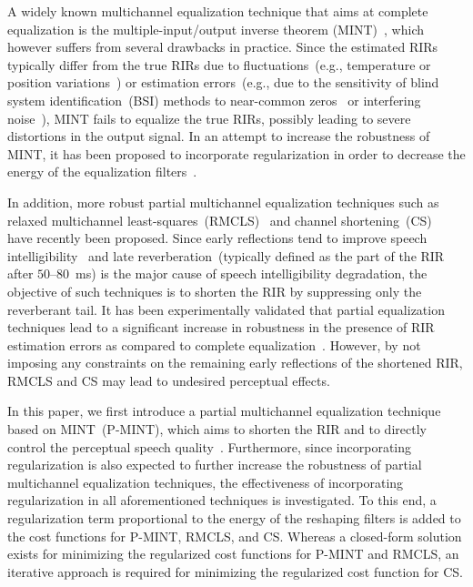\documentclass[10pt]{IEEEtran}
\begin{document}
A widely known multichannel equalization technique that aims at complete equalization is the multiple-input/output inverse theorem (MINT)~\cite{Miyoshi_ITASS_1988}, which however suffers from several drawbacks in practice.
Since the estimated RIRs typically differ from the true RIRs due to fluctuations~(e.g., temperature or position variations~\cite{Radlovic_ITSA_2000}) or estimation errors~(e.g., due to the sensitivity of blind system identification~(BSI) methods to near-common zeros~\cite{Lin_ITASLP_2012} or interfering noise~\cite{Hasan_EUSIPCO_2006}), MINT fails to equalize the true RIRs, possibly leading to severe distortions in the output signal.
In an attempt to increase the robustness of MINT, it has been proposed to incorporate regularization in order to decrease the energy of the equalization filters~\cite{Hikichi_EURASIP_2007}.

In addition, more robust partial multichannel equalization techniques such as relaxed multichannel least-squares~(RMCLS)~\cite{Zhang_IWAENC_2010} and channel shortening~(CS)~\cite{Kallinger_ICASSP_2006} have recently been proposed.
Since early reflections tend to improve speech intelligibility~\cite{Arweiler_JASA_2011,Warzybok_JASA_2012} and late reverberation~(typically defined as the part of the RIR after $50$--$80$~ms) is the major cause of speech intelligibility degradation, the objective of such techniques is to shorten the RIR by suppressing only the reverberant tail.
It has been experimentally validated that partial equalization techniques lead to a significant increase in robustness in the presence of RIR estimation errors as compared to complete equalization~\cite{Zhang_IWAENC_2010}.
However, by not imposing any constraints on the remaining early reflections of the shortened RIR, RMCLS and CS may lead to undesired perceptual effects.

In this paper, we first introduce a partial multichannel equalization technique based on MINT~(P-MINT), which aims to shorten the RIR and to directly control the perceptual speech quality~\cite{Kodrasi_ICASSP_2012}.
Furthermore, since incorporating regularization is also expected to further increase the robustness of partial multichannel equalization techniques, the effectiveness of incorporating regularization in all aforementioned techniques is investigated.
To this end, a regularization term proportional to the energy of the reshaping filters is added to the cost functions for P-MINT, RMCLS, and CS.
Whereas a closed-form solution exists for minimizing the regularized cost functions for P-MINT and RMCLS, an iterative approach is required for minimizing the regularized cost function for CS.
\end{document}
